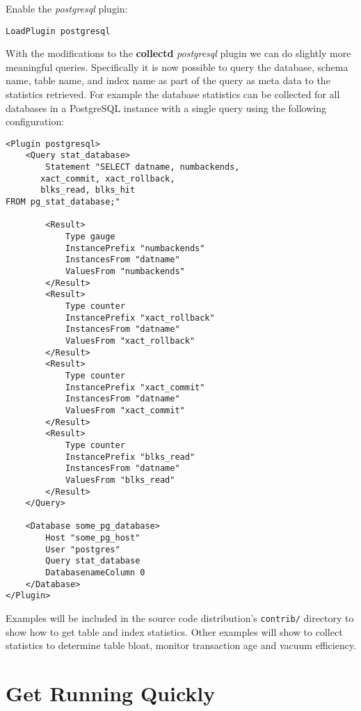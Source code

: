 \documentclass[a4paper,twoside,12pt]{article}
\begin{document}
Enable the \textit{postgresql} plugin:
\lstset{language=xml}
\begin{lstlisting}
LoadPlugin postgresql
\end{lstlisting}

With the modifications to the \textbf{collectd} \textit{postgresql} plugin we
can do slightly more meaningful queries.  Specifically it is now possible to
query the database, schema name, table name, and index name as part of the
query as meta data to the statistics retrieved.  For example the database
statistics can be collected for all databases in a PostgreSQL instance with a
single query using the following configuration:
\lstset{language=xml}
\begin{lstlisting}
<Plugin postgresql>
    <Query stat_database>
        Statement "SELECT datname, numbackends,
       xact_commit, xact_rollback,
       blks_read, blks_hit
FROM pg_stat_database;"

        <Result>
            Type gauge
            InstancePrefix "numbackends"
            InstancesFrom "datname"
            ValuesFrom "numbackends"
        </Result>
        <Result>
            Type counter
            InstancePrefix "xact_rollback"
            InstancesFrom "datname"
            ValuesFrom "xact_rollback"
        </Result>
        <Result>
            Type counter
            InstancePrefix "xact_commit"
            InstancesFrom "datname"
            ValuesFrom "xact_commit"
        </Result>
        <Result>
            Type counter
            InstancePrefix "blks_read"
            InstancesFrom "datname"
            ValuesFrom "blks_read"
        </Result>
    </Query>

    <Database some_pg_database>
        Host "some_pg_host"
        User "postgres"
        Query stat_database
        DatabasenameColumn 0
    </Database>
</Plugin>
\end{lstlisting}

Examples will be included in the source code distribution's \texttt{contrib/}
directory to show how to get table and index statistics.  Other examples will
show to collect statistics to determine table bloat, monitor transaction age
and vacuum efficiency.

\section{Get Running Quickly}
\end{document}
